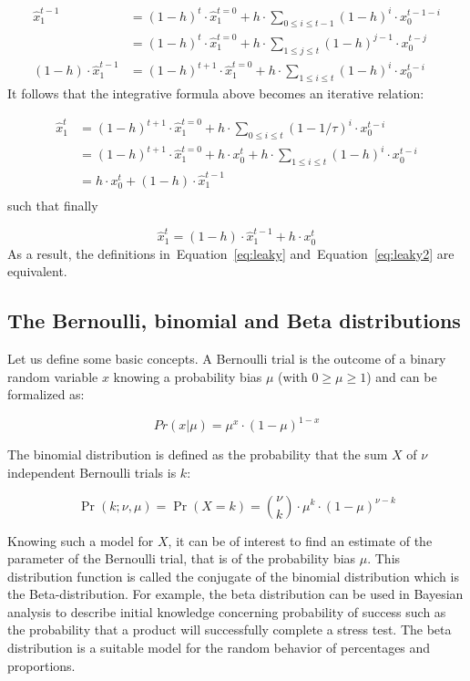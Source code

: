 \documentclass[10pt,letterpaper]{article}
\newcommand{\eq}[1]{\begin{equation*}#1\end{equation*}}
\newcommand{\eqs}[1]{\begin{align*}#1\end{align*}}
\newcommand{\seeEq}[1]{Equation~\ref{eq:#1}}
\begin{document}
\eqs{
\hat{x}_1^{t-1}	&= (1-h)^{t} \cdot \hat{x}_1^{t=0} + h \cdot \sum_{0\leq i \leq t-1} (1 - h)^{i} \cdot x_0^{t-1-i} \\
                &= (1-h)^{t} \cdot \hat{x}_1^{t=0} + h \cdot \sum_{1\leq j \leq t} (1 - h)^{j-1} \cdot x_0^{t-j} \\ %
(1 - h) \cdot \hat{x}_1^{t-1} &= (1-h)^{t+1} \cdot \hat{x}_1^{t=0} +  h \cdot \sum_{1\leq i \leq t} (1 - h)^{i} \cdot x_0^{t-i}
                }
It follows that the integrative formula above becomes an iterative relation:

\eqs{
\hat{x}_1^{t}	&= (1-h)^{t+1} \cdot \hat{x}_1^{t=0} + h \cdot \sum_{0\leq i \leq t} (1 - 1/\tau)^{i} \cdot x_0^{t-i} \\
				&= (1-h)^{t+1} \cdot \hat{x}_1^{t=0} + h \cdot x_0^{t} + h \cdot \sum_{1\leq i \leq t} (1 - h)^{i} \cdot x_0^{t-i} \\
				&= h \cdot x_0^{t} + (1 - h) \cdot \hat{x}_1^{t-1} \\
}
such that finally

\eq{
\hat{x}_1^{t} = (1 - h) \cdot \hat{x}_1^{t-1} + h \cdot x_0^t
}
As a result, the definitions in~\seeEq{leaky} and~\seeEq{leaky2} are equivalent.


\subsection{The Bernoulli, binomial and Beta distributions}
\label{app:beta}

Let us define some basic concepts. A Bernoulli trial is the outcome of a binary random variable $x$ knowing a probability bias $\mu$ (with $0 \geq \mu \geq 1$) and can be formalized as:

\eq{
Pr(x | \mu) = \mu^x \cdot (1-\mu)^{1-x}
}

The binomial distribution is defined as the probability that the sum $X$ of $\nu$ independent Bernoulli trials is $k$:

\eq{
\Pr(k;\nu,\mu) = \Pr(X = k) = {\nu\choose k} \cdot \mu^k \cdot (1-\mu)^{\nu-k}
}

Knowing such a model for $X$, it can be of interest to find an estimate of the parameter of the Bernoulli trial, that is of the probability bias $\mu$. This distribution function is called the conjugate of the binomial distribution which is the Beta-distribution. For example, the beta distribution can be used in Bayesian analysis to describe initial knowledge concerning probability of success such as the probability that a product will successfully complete a stress test. The beta distribution is a suitable model for the random behavior of percentages and proportions.
\end{document}
